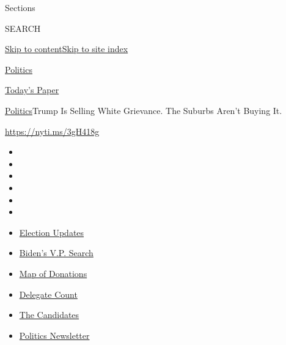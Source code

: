 Sections

SEARCH

\protect\hyperlink{site-content}{Skip to
content}\protect\hyperlink{site-index}{Skip to site index}

\href{https://www.nytimes.com/section/politics}{Politics}

\href{https://myaccount.nytimes.com/auth/login?response_type=cookie\&client_id=vi}{}

\href{https://www.nytimes.com/section/todayspaper}{Today's Paper}

\href{/section/politics}{Politics}\textbar{}Trump Is Selling White
Grievance. The Suburbs Aren't Buying It.

\url{https://nyti.ms/3gH418g}

\begin{itemize}
\item
\item
\item
\item
\item
\item
\end{itemize}

\begin{itemize}
\item
  \href{https://www.nytimes.com/2020/07/31/us/elections/biden-vs-trump.html?action=click\&pgtype=Article\&state=default\&region=TOP_BANNER\&context=storylines_menu}{Election
  Updates}
\item
  \href{https://www.nytimes.com/article/biden-vice-president-2020.html?action=click\&pgtype=Article\&state=default\&region=TOP_BANNER\&context=storylines_menu}{Biden's
  V.P. Search}
\item
  \href{https://www.nytimes.com/interactive/2020/07/24/us/politics/trump-biden-campaign-donors.html?action=click\&pgtype=Article\&state=default\&region=TOP_BANNER\&context=storylines_menu}{Map
  of Donations}
\item
  \href{https://www.nytimes.com/interactive/2020/us/elections/delegate-count-primary-results.html?action=click\&pgtype=Article\&state=default\&region=TOP_BANNER\&context=storylines_menu}{Delegate
  Count}
\item
  \href{https://www.nytimes.com/interactive/2019/us/politics/2020-presidential-candidates.html?action=click\&pgtype=Article\&state=default\&region=TOP_BANNER\&context=storylines_menu}{The
  Candidates}
\item
  \href{https://www.nytimes.com/newsletters/politics?action=click\&pgtype=Article\&state=default\&region=TOP_BANNER\&context=storylines_menu}{Politics
  Newsletter}
\end{itemize}

